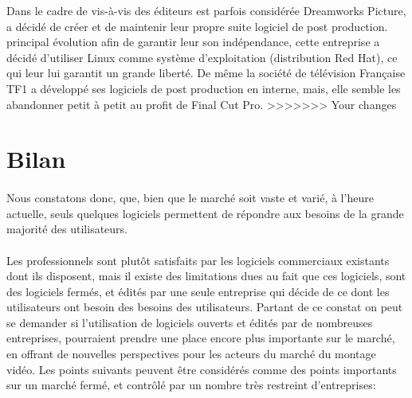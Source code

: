 \begin{itemize}
Dans le cadre de %
vis-à-vis des éditeurs est parfois considérée %
Dreamworks Picture, a décidé de créer et de maintenir leur propre
suite logiciel \cite {Dreamworks} de post production. %
principal %
évolution %
afin de garantir leur son indépendance, cette entreprise a décidé
d'utiliser Linux comme système d'exploitation (distribution Red Hat),
ce qui leur lui garantit un grande liberté. De même la société
de télévision Française TF1 a développé ses logiciels de post
production en interne, mais, elle semble les abandonner petit à petit
au profit de Final Cut Pro.
>>>>>>> Your changes

\newpage

\section {Bilan}

\paragraph { }

Nous constatons donc, que, bien que le marché soit vaste et varié,
à l'heure actuelle, seuls quelques logiciels permettent de répondre
aux besoins de la grande majorité des utilisateurs.

\paragraph{}

Les professionnels sont plutôt satisfaits par les logiciels commerciaux
existants dont ils disposent, mais il existe des limitations dues au
fait que ces logiciels, sont des logiciels fermés, et édités par une
seule entreprise qui décide de ce dont les utilisateurs ont besoin des
besoins des utilisateurs. Partant de ce constat on peut se demander
si l'utilisation de logiciels ouverts et édités par de nombreuses
entreprises, pourraient prendre une place encore plus importante sur le
marché, en offrant de nouvelles perspectives pour les acteurs du marché
du montage vidéo. Les points suivants peuvent être considérés comme
des points importants sur un marché fermé, et contrôlé par un nombre
très restreint d'entreprises:


\end{itemize}
